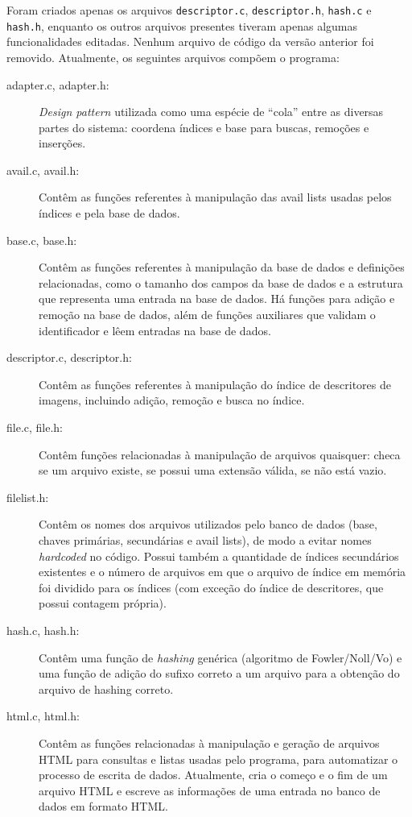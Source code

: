 \documentclass[a4paper,10pt]{article}
\begin{document}
Foram criados apenas os arquivos \texttt{descriptor.c}, \texttt{descriptor.h}, \texttt{hash.c} e \texttt{hash.h}, enquanto os outros arquivos presentes tiveram apenas algumas funcionalidades editadas. Nenhum arquivo de código da versão anterior foi removido. Atualmente, os seguintes arquivos compõem o programa:

\begin{description}
\item[adapter.c, adapter.h:] \textit{Design pattern}\cite{adapterwiki} utilizada como uma espécie de ``cola'' entre as diversas partes do sistema: coordena índices e base para buscas, remoções e inserções.

\item[avail.c, avail.h:] Contêm as funções referentes à manipulação das avail lists usadas pelos índices e pela base de dados.

\item[base.c, base.h:] Contêm as funções referentes à manipulação da base de dados e definições relacionadas, como o tamanho dos campos da base de dados e a estrutura que representa uma entrada na base de dados. Há funções para adição e remoção na base de dados, além de funções auxiliares que validam o identificador e lêem entradas na base de dados.

\item[descriptor.c, descriptor.h:] Contêm as funções referentes à manipulação do índice de descritores de imagens, incluindo adição, remoção e busca no índice.

 \item[file.c, file.h:] Contêm funções relacionadas à manipulação de arquivos quaisquer: checa se um arquivo existe, se possui uma extensão válida, se não está vazio.

\item[filelist.h:] Contêm os nomes dos arquivos utilizados pelo banco de dados (base, chaves primárias, secundárias e avail lists), de modo a evitar nomes \textit{hardcoded} no código. Possui também a quantidade de índices secundários existentes e o número de arquivos em que o arquivo de índice em memória foi dividido para os índices (com exceção do índice de descritores, que possui contagem própria).

\item[hash.c, hash.h:] Contêm uma função de \textit{hashing} genérica (algoritmo de Fowler/Noll/Vo) e uma função de adição do sufixo correto a um arquivo para a obtenção do arquivo de hashing correto.

\item[html.c, html.h:] Contêm as funções relacionadas à manipulação e geração de arquivos HTML para consultas e listas usadas pelo programa, para automatizar o processo de escrita de dados. Atualmente, cria o começo e o fim de um arquivo HTML e escreve as informações de uma entrada no banco de dados em formato HTML.


\end{description}
\end{document}
